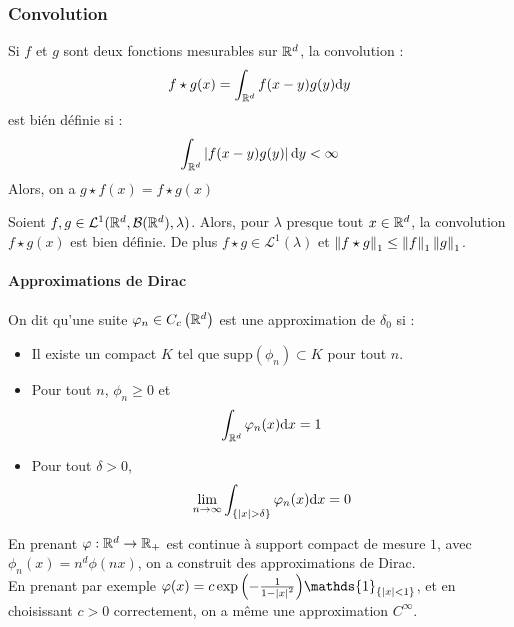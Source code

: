 \documentclass{cours}
\begin{document}
\subsubsection{Convolution}
\begin{definition}
    Si $f$ et $g$ sont deux fonctions mesurables sur $\mathbb{R}^{d}$, la convolution :
    \[
        f \star g (x) = \int_{\mathbb{R}^{d}} f(x-y)g(y)\mathrm{d}y
    \]
    est bién définie si :
    \[
        \int_{\mathbb{R}^{d}}\left|f(x - y)g(y)\right| \mathrm{d}y < \infty
    \]
    Alors, on a $g\star f(x)= f\star g(x)$
\end{definition}

\begin{proposition}
    Soient $f, g \in \mathcal{L}^{1}(\mathbb{R}^{d}, \mathcal{B}(\mathbb{R}^{d}), \lambda)$. Alors, pour $\lambda$ presque tout $x \in\mathbb{R}^{d}$, la convolution $f \star g(x)$ est bien définie. De plus $f \star g \in \mathcal{L}^{1}(\lambda)$ et $\left\lVert f \star g \right\rVert_{1} \leq \left\lVert f \right\rVert_{1}\left\lVert g \right\rVert_{1}$.
\end{proposition}

\paragraph{Approximations de Dirac}
\begin{definition}
    On dit qu'une suite $\varphi_{n}\in C_{c}\left(\mathbb{R}^{d}\right)$ est une approximation de $\delta_{0}$ si :
    \begin{itemize}
        \item Il existe un compact $K$ tel que $\text{supp}(\phi_{n}) \subset K$ pour tout $n$.
        \item Pour tout $n$, $\phi_{n} \geq 0$ et \[\int_{\mathbb{R}^{d}} \varphi_{n}(x) \mathrm{d}x = 1\]
        \item Pour tout $\delta > 0$,
              \[\lim_{n\to\infty}\int_{\left\{\left|x\right| > \delta\right\}} \varphi_{n}(x)\mathrm{d}x = 0\]
    \end{itemize}
\end{definition}
\begin{proposition}
    En prenant $\varphi : \mathbb{R}^{d} \rightarrow \mathbb{R}_{+}$ est continue à support compact de mesure $1$, avec $\phi_{n}(x) = n^{d}\phi(nx)$, on a construit des approximations de Dirac.\\
    En prenant par exemple $\phi(x) = c \exp{\left(-\frac{1}{1 - \abs{x}^{2}}\right)}\mathds{1}_{\left\{\abs{x} < 1\right\}}$, et en choisissant $c > 0$ correctement, on a même une approximation $C^{\infty}$.
\end{proposition}
\end{document}
